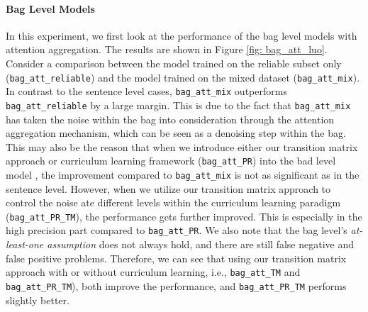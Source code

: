 \paragraph{Bag Level Models}
In this experiment, we first look at the performance of the bag level models with attention aggregation. The results are shown in Figure \ref{fig: bag_att_luo}.
Consider a comparison between the  model trained on the reliable subset only (\texttt{bag\_att\_reliable}) and  the model trained on the mixed dataset (\texttt{bag\_att\_mix}).
In contrast to the sentence level cases, \texttt{bag\_att\_mix} outperforms \texttt{bag\_att\_reliable} by a large margin. This is due to the fact that  \texttt{bag\_att\_mix} has taken the noise within the bag into consideration through the attention aggregation mechanism, which can be seen as a denoising step within the bag.
This may also be the reason that when we introduce either our transition matrix approach   or curriculum learning framework (\texttt{bag\_att\_PR})   into the bad level model , the improvement compared to \texttt{bag\_att\_mix}  is not as significant as in the sentence level.
However, when we utilize our transition matrix approach to control the noise ate different levels within the curriculum learning paradigm (\texttt{bag\_att\_PR\_TM}), the performance gets further improved. This is especially in the high precision part compared to \texttt{bag\_att\_PR}.
We also note that the bag level's  \textit{at-least-one assumption} does not always hold, and there are still false negative and false positive problems. Therefore, we can see that using our transition matrix approach with  or without curriculum learning, i.e.,  \texttt{bag\_att\_TM}  and \texttt{bag\_att\_PR\_TM}), both improve the performance, and \texttt{bag\_att\_PR\_TM} performs slightly better.

